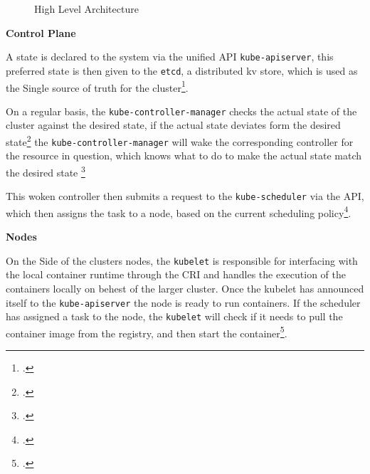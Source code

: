 \begin{figure}[!ht]
{
    }
    \caption{High Level Architecture\protect\footnotemark}
    \label{fig:high_level_architecture}
\end{figure}



\textbf{Control Plane}

A state is declared to the system via the unified \ac{API} \texttt{kube-apiserver},
this preferred state is then given to the \texttt{etcd}, a distributed \gls{kv store},
which is used as the \gls{Single source of truth} for the cluster\footcite{nalawalaComprehensiveStudyEtcd2022}.

On a regular basis, the \texttt{kube-controller-manager} checks the actual state of the cluster against the desired state,
if the actual state deviates form the desired state\footcite{kubernetes-docsCloudControllerManager}
the \linebreak
\texttt{kube-controller-manager} will wake the corresponding controller for the resource in question,
which knows what to do to make the actual state match the desired state \footcite{kubernetes-docsControllers}

This woken controller then submits a request to the \texttt{kube-scheduler} via the \ac{API},
which then assigns the task to a node, based on the current scheduling policy\footcite{kubernetes-docsKubernetesScheduler}.

\textbf{Nodes}

On the Side of the clusters nodes, the \texttt{kubelet} is responsible for interfacing with the local container runtime
through the \ac{CRI} and handles the execution of the containers locally on behest of the larger cluster.
Once the kubelet has announced itself to the \texttt{kube-apiserver} the node is ready to run containers.
If the scheduler has assigned a task to the node, the \texttt{kubelet} will check if it
needs to pull the container image from the registry, and then start the container\footcite{kubernetes-docsKubelet}.

